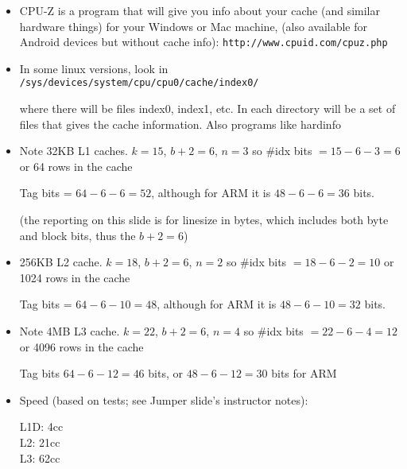 \begin{frame}[fragile]
{\begin{columns}
\end{columns}
}

\BNotes\ifnum{}
\begin{itemize}
\item CPU-Z is a program that will give you info about your cache (and
	similar hardware things) for your Windows or Mac machine, (also available
	for Android devices but without cache info):
\texttt{http://www.cpuid.com/cpuz.php}

\item In some linux versions, look in 
\texttt{/sys/devices/system/cpu/cpu0/cache/index0/}

	where there will be files index0, index1, etc.  In each directory will
	be a set of files that gives the cache information.  Also programs like hardinfo

      \item Note 32KB L1 caches. $k=15$, $b+2=6$, $n=3$ so \#idx bits $= 15-6-3=6$ or 64 rows in the cache

        Tag bits = $64-6-6=52$, although for ARM it is $48-6-6=36$ bits.

        (the reporting on this slide is for linesize in bytes, which includes both byte and block bits, thus the $b+2=6$)
        \item 256KB L2 cache.  $k=18$, $b+2=6$, $n=2$ so \#idx bits $=18-6-2=10$ or 1024 rows in the cache

          Tag bits = $64-6-10=48$, although for ARM it is $48-6-10=32$ bits.

        \item Note 4MB L3 cache.  $k=22$, $b+2=6$, $n=4$ so \#idx bits $=22-6-4=12$ or 4096 rows in the cache

          Tag bits $64-6-12=46$ bits, or $48-6-12=30$ bits for ARM

\item Speed (based on tests; see Jumper slide's instructor notes):

		L1D: 4cc\\
		L2: 21cc\\
		L3: 62cc\\
\end{itemize}
\fi\ENotes
\end{frame}



